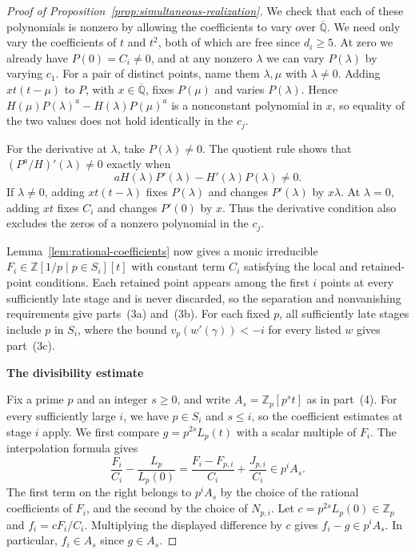 \documentclass{article}
\newcommand{\proofheading}[1]{%
    \par\addvspace{\smallskipamount}%
    \noindent\textbf{#1}\par\nobreak
}
\theoremstyle{remark}
\begin{document}
\begin{proof}[Proof of Proposition~\ref{prop:simultaneous-realization}]
    We check that each of these polynomials is nonzero by allowing the coefficients to vary over $\overline{\mathbb{Q}}$.
    We need only vary the coefficients of $t$ and $t^2$, both of which are free since $d_i \ge 5$.
    At zero we already have $P(0) = C_i \ne 0$, and at any nonzero $\lambda$ we can vary $P(\lambda)$ by varying $c_1$.
    For a pair of distinct points, name them $\lambda, \mu$ with $\lambda \ne 0$.
    Adding $x t(t - \mu)$ to $P$, with $x \in \overline{\mathbb{Q}}$, fixes $P(\mu)$ and varies $P(\lambda)$.
    Hence $H(\mu)P(\lambda)^a - H(\lambda)P(\mu)^a$ is a nonconstant polynomial in $x$, so equality of the two values does not hold identically in the $c_j$.

    For the derivative at $\lambda$, take $P(\lambda) \ne 0$.
    The quotient rule shows that $(P^a/H)'(\lambda) \ne 0$ exactly when
    \[
        a H(\lambda)P'(\lambda) - H'(\lambda)P(\lambda) \ne 0.
    \]
    If $\lambda \ne 0$, adding $x t(t - \lambda)$ fixes $P(\lambda)$ and changes $P'(\lambda)$ by $x \lambda$.
    At $\lambda = 0$, adding $x t$ fixes $C_i$ and changes $P'(0)$ by $x$.
    Thus the derivative condition also excludes the zeros of a nonzero polynomial in the $c_j$.

    Lemma~\ref{lem:rational-coefficients} now gives a monic irreducible $F_i \in \mathbb{Z}[1/p \mid p \in S_i][t]$ with constant term $C_i$ satisfying the local and retained-point conditions.
    Each retained point appears among the first $i$ points at every sufficiently late stage and is never discarded, so the separation and nonvanishing requirements give parts~(3a) and~(3b).
    For each fixed $p$, all sufficiently late stages include $p$ in $S_i$, where the bound $v_p(w'(\gamma)) < -i$ for every listed $w$ gives part~(3c).

    \proofheading{The divisibility estimate}
    Fix a prime $p$ and an integer $s \ge 0$, and write $A_s = \mathbb{Z}_p[p^s t]$ as in part~(4).
    For every sufficiently large $i$, we have $p \in S_i$ and $s \le i$, so the coefficient estimates at stage $i$ apply.
    We first compare $g = p^{2s} L_p(t)$ with a scalar multiple of $F_i$.
    The interpolation formula gives
    \[
        \frac{F_i}{C_i} - \frac{L_p}{L_p(0)}
        = \frac{F_i - F_{p, i}}{C_i} + \frac{J_{p, i}}{C_i} \in p^i A_s.
    \]
    The first term on the right belongs to $p^i A_s$ by the choice of the rational coefficients of $F_i$, and the second by the choice of $N_{p, i}$.
    Let $c = p^{2s} L_p(0) \in \mathbb{Z}_p$ and $f_i = c F_i/C_i$.
    Multiplying the displayed difference by $c$ gives $f_i - g \in p^i A_s$.
    In particular, $f_i \in A_s$ since $g \in A_s$.


\end{proof}
\end{document}
